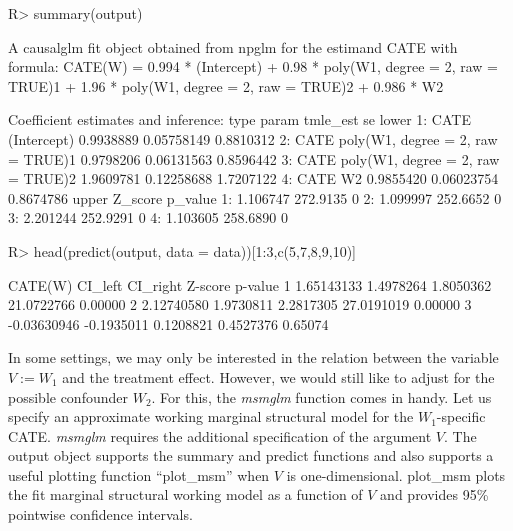 \documentclass[
]{jss}
\begin{document}
\begin{CodeChunk}
\begin{CodeInput}
R> summary(output)
\end{CodeInput}
\begin{CodeOutput}
A causalglm fit object obtained from npglm for the estimand CATE with formula: 
CATE(W) = 0.994 * (Intercept) + 0.98 * poly(W1, degree = 2, raw = TRUE)1 + 1.96 * poly(W1, degree = 2, raw = TRUE)2 + 0.986 * W2

Coefficient estimates and inference:
   type                             param  tmle_est         se     lower
1: CATE                       (Intercept) 0.9938889 0.05758149 0.8810312
2: CATE poly(W1, degree = 2, raw = TRUE)1 0.9798206 0.06131563 0.8596442
3: CATE poly(W1, degree = 2, raw = TRUE)2 1.9609781 0.12258688 1.7207122
4: CATE                                W2 0.9855420 0.06023754 0.8674786
      upper  Z_score p_value
1: 1.106747 272.9135       0
2: 1.099997 252.6652       0
3: 2.201244 252.9291       0
4: 1.103605 258.6890       0
\end{CodeOutput}
\begin{CodeInput}
R> head(predict(output, data = data))[1:3,c(5,7,8,9,10)]
\end{CodeInput}
\begin{CodeOutput}
      CATE(W)    CI_left  CI_right    Z-score p-value
1  1.65143133  1.4978264 1.8050362 21.0722766 0.00000
2  2.12740580  1.9730811 2.2817305 27.0191019 0.00000
3 -0.03630946 -0.1935011 0.1208821  0.4527376 0.65074
\end{CodeOutput}
\end{CodeChunk}

In some settings, we may only be interested in the relation between the
variable \(V := W_1\) and the treatment effect. However, we would still
like to adjust for the possible confounder \(W_2\). For this, the
\textit{msmglm} function comes in handy. Let us specify an approximate
working marginal structural model for the \(W_1\)-specific CATE.
\textit{msmglm} requires the additional specification of the argument
\(V\). The output object supports the summary and predict functions and
also supports a useful plotting function ``plot\_msm'' when \(V\) is
one-dimensional. plot\_msm plots the fit marginal structural working
model as a function of \(V\) and provides 95\% pointwise confidence
intervals.
\end{document}
